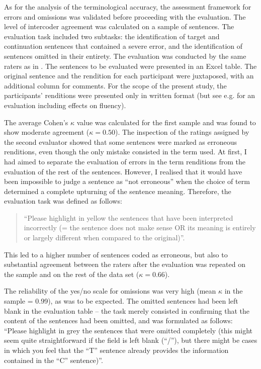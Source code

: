  \label{evaluation_errors}

As for the analysis of the terminological accuracy, the assessment framework for errors and omissions was validated before proceeding with the evaluation. The level of intercoder agreement was calculated on a sample of sentences. The evaluation task included two subtasks: the identification of target and continuation sentences that contained a severe error, and the identification of sentences omitted in their entirety. The evaluation was conducted by the same raters as in . The sentences to be evaluated were presented in an Excel table. The original sentence and the rendition for each participant were juxtaposed, with an additional column for comments. For the scope of the present study, the participants' renditions were presented only in written format (but see e.g. \citealt{montecchio_masterarbeit_maddalena_2021} for an evaluation including effects on fluency).

The average Cohen's $\kappa$ value was calculated for the first sample and was found to show moderate agreement ($\kappa = 0.50$). The inspection of the ratings assigned by the second evaluator showed that some sentences were marked as erroneous renditions, even though the only mistake consisted in the term used. At first, I had aimed to separate the evaluation of errors in the term renditions from the evaluation of the rest of the sentences. However, I realised that it would have been impossible to judge a sentence as ``not erroneous'' when the choice of term determined a complete upturning of the sentence meaning. Therefore, the evaluation task was defined as follows:

\begin{quote}
   ``Please highlight in yellow the sentences that have been interpreted incorrectly (= the sentence does not make sense OR its meaning is entirely or largely different when compared to the original)''.
\end{quote}

This led to a higher number of sentences coded as erroneous, but also to substantial agreement between the raters after the evaluation was repeated on the sample and on the rest of the data set ($\kappa = 0.66$).

The reliability of the yes/no scale for omissions was very high (mean $\kappa$ in the sample = 0.99), as was to be expected. The omitted sentences had been left blank in the evaluation table – the task merely consisted in confirming that the content of the sentences had been omitted, and was formulated as follows: ``Please highlight in grey the sentences that were omitted completely (this might seem quite straightforward if the field is left blank (``/''), but there might be cases in which you feel that the ``T'' sentence already provides the information contained in the ``C'' sentence)''.

